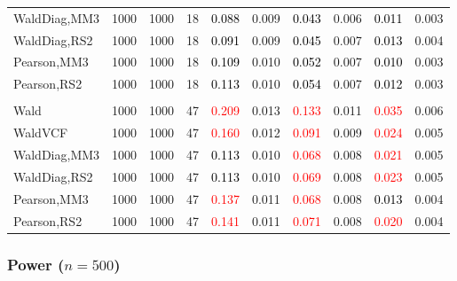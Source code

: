 \documentclass[
]{article}
\begin{document}
\begin{table}[H]
{\begin{tabular}[t]{lrrrrrrlrr}
\hspace{1em}WaldDiag,MM3 & 1000 & 1000 & 18 & \textcolor{black}{0.088} & 0.009 & \textcolor{black}{0.043} & 0.006 & \textcolor{black}{0.011} & 0.003\\
\hspace{1em}WaldDiag,RS2 & 1000 & 1000 & 18 & \textcolor{black}{0.091} & 0.009 & \textcolor{black}{0.045} & 0.007 & \textcolor{black}{0.013} & 0.004\\
\hspace{1em}Pearson,MM3 & 1000 & 1000 & 18 & \textcolor{black}{0.109} & 0.010 & \textcolor{black}{0.052} & 0.007 & \textcolor{black}{0.010} & 0.003\\
\hspace{1em}Pearson,RS2 & 1000 & 1000 & 18 & \textcolor{black}{0.113} & 0.010 & \textcolor{black}{0.054} & 0.007 & \textcolor{black}{0.012} & 0.003\\
\addlinespace[0.3em]
\multicolumn{10}{l}{\textbf{3F 15V}}\\
\hspace{1em}Wald & 1000 & 1000 & 47 & \textcolor{red}{0.209} & 0.013 & \textcolor{red}{0.133} & 0.011 & \textcolor{red}{0.035} & 0.006\\
\hspace{1em}WaldVCF & 1000 & 1000 & 47 & \textcolor{red}{0.160} & 0.012 & \textcolor{red}{0.091} & 0.009 & \textcolor{red}{0.024} & 0.005\\
\hspace{1em}WaldDiag,MM3 & 1000 & 1000 & 47 & \textcolor{black}{0.113} & 0.010 & \textcolor{red}{0.068} & 0.008 & \textcolor{red}{0.021} & 0.005\\
\hspace{1em}WaldDiag,RS2 & 1000 & 1000 & 47 & \textcolor{black}{0.113} & 0.010 & \textcolor{red}{0.069} & 0.008 & \textcolor{red}{0.023} & 0.005\\
\hspace{1em}Pearson,MM3 & 1000 & 1000 & 47 & \textcolor{red}{0.137} & 0.011 & \textcolor{red}{0.068} & 0.008 & \textcolor{black}{0.013} & 0.004\\
\hspace{1em}Pearson,RS2 & 1000 & 1000 & 47 & \textcolor{red}{0.141} & 0.011 & \textcolor{red}{0.071} & 0.008 & \textcolor{red}{0.020} & 0.004\\
\bottomrule
\end{tabular}}
\endgroup{}
\end{table}

\hypertarget{power-n500-2}{%
\subsubsection{\texorpdfstring{Power
(\(n=500\))}{Power (n=500)}}\label{power-n500-2}}
\end{document}
